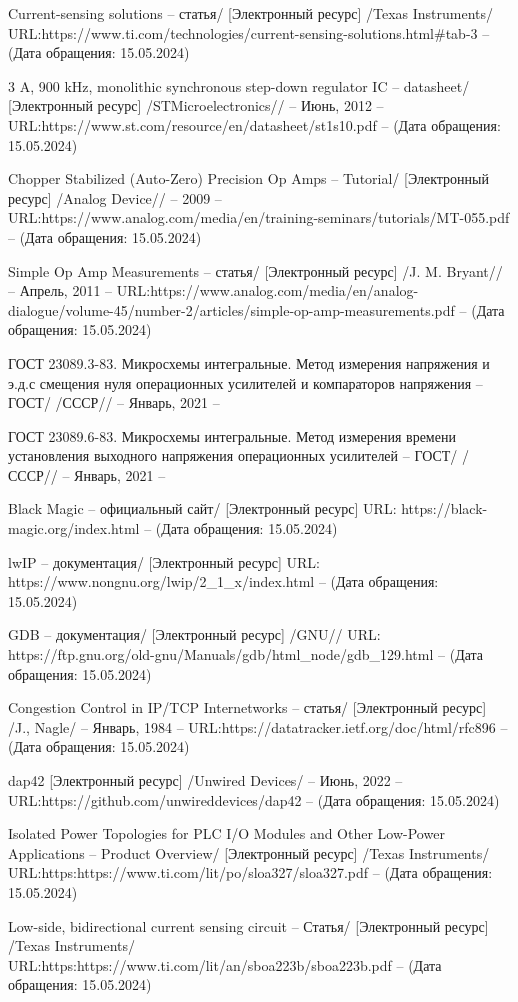 \begin{thebibliography}{00}
 Current-sensing solutions
-- статья/
[Электронный ресурс] /Texas Instruments/ 
URL:https://www.ti.com/technologies/current-sensing-solutions.html\#tab-3
-- (Дата обращения: 15.05.2024)

 3 A, 900 kHz, monolithic synchronous step-down regulator IC
 -- datasheet/
  [Электронный ресурс]
 /STMicroelectronics// -- Июнь, 2012 -- 
 URL:https://www.st.com/resource/en/datasheet/st1s10.pdf --
 (Дата обращения: 15.05.2024)

 Chopper Stabilized (Auto-Zero) Precision Op Amps 
-- Tutorial/
[Электронный ресурс] /Analog Device// --  2009 -- 
URL:https://www.analog.com/media/en/training-seminars/tutorials/MT-055.pdf
-- (Дата обращения: 15.05.2024)

 Simple Op Amp Measurements
-- статья/
[Электронный ресурс] /J. M. Bryant// -- Апрель, 2011 -- 
URL:https://www.analog.com/media/en/analog-dialogue/volume-45/number-2/articles/simple-op-amp-measurements.pdf
-- (Дата обращения: 15.05.2024)

 ГОСТ 23089.3-83. Микросхемы интегральные. Метод измерения напряжения и э.д.с 
смещения нуля операционных усилителей и компараторов напряжения
-- ГОСТ/
 /СССР// -- Январь, 2021 -- 

 ГОСТ 23089.6-83. Микросхемы интегральные. Метод измерения времени установления выходного 
напряжения операционных усилителей 
-- ГОСТ/
 /СССР// -- Январь, 2021 -- 

 Black Magic
-- официальный сайт/
[Электронный ресурс]
URL: https://black-magic.org/index.html
-- (Дата обращения: 15.05.2024)

 lwIP
-- документация/
[Электронный ресурс]
URL: https://www.nongnu.org/lwip/2\_1\_x/index.html
-- (Дата обращения: 15.05.2024)

 GDB
-- документация/
[Электронный ресурс] /GNU//
URL: https://ftp.gnu.org/old-gnu/Manuals/gdb/html\_node/gdb\_129.html
-- (Дата обращения: 15.05.2024)

 Congestion Control in IP/TCP Internetworks
-- статья/
[Электронный ресурс] /J., Nagle/ -- Январь, 1984 --
URL:https://datatracker.ietf.org/doc/html/rfc896
-- (Дата обращения: 15.05.2024)

 dap42
[Электронный ресурс] /Unwired Devices/ -- Июнь, 2022 --
URL:https://github.com/unwireddevices/dap42
-- (Дата обращения: 15.05.2024)

 Isolated Power Topologies for PLC I/O Modules and Other
Low-Power Applications
-- Product Overview/
[Электронный ресурс] /Texas Instruments/ 
URL:https:https://www.ti.com/lit/po/sloa327/sloa327.pdf
-- (Дата обращения: 15.05.2024)

 Low-side, bidirectional current sensing circuit
-- Статья/
[Электронный ресурс] /Texas Instruments/ 
URL:https:https://www.ti.com/lit/an/sboa223b/sboa223b.pdf
-- (Дата обращения: 15.05.2024)






\end{thebibliography}
